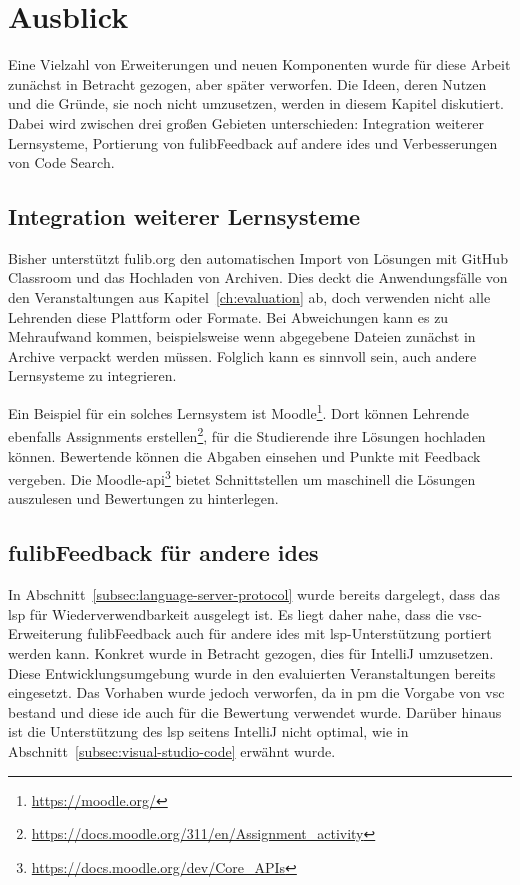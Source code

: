 \chapter{Ausblick}\label{ch:future-work}

Eine Vielzahl von Erweiterungen und neuen Komponenten wurde für diese Arbeit zunächst in Betracht gezogen, aber später verworfen.
Die Ideen, deren Nutzen und die Gründe, sie noch nicht umzusetzen, werden in diesem Kapitel diskutiert.
Dabei wird zwischen drei großen Gebieten unterschieden:
Integration weiterer Lernsysteme, Portierung von fulibFeedback auf andere \acp{ide} und Verbesserungen von Code Search.

\section{Integration weiterer Lernsysteme}

Bisher unterstützt fulib.org den automatischen Import von Lösungen mit GitHub Classroom und das Hochladen von Archiven.
Dies deckt die Anwendungsfälle von den Veranstaltungen aus Kapitel~\ref{ch:evaluation} ab, doch verwenden nicht alle Lehrenden diese Plattform oder Formate.
Bei Abweichungen kann es zu Mehraufwand kommen, beispielsweise wenn abgegebene Dateien zunächst in Archive verpackt werden müssen.
Folglich kann es sinnvoll sein, auch andere Lernsysteme zu integrieren.

Ein Beispiel für ein solches Lernsystem ist Moodle\footnote{\url{https://moodle.org/}}.
Dort können Lehrende ebenfalls Assignments erstellen\footnote{\url{https://docs.moodle.org/311/en/Assignment_activity}}, für die Studierende ihre Lösungen hochladen können.
Bewertende können die Abgaben einsehen und Punkte mit Feedback vergeben.
Die Moodle-\ac{api}\footnote{\url{https://docs.moodle.org/dev/Core_APIs}} bietet Schnittstellen um maschinell die Lösungen auszulesen und Bewertungen zu hinterlegen.

\section{fulibFeedback für andere \acsp{ide}}\label{sec:other-ides}

In Abschnitt~\ref{subsec:language-server-protocol} wurde bereits dargelegt, dass das \ac{lsp} für Wiederverwendbarkeit ausgelegt ist.
Es liegt daher nahe, dass die \ac{vsc}-Erweiterung fulibFeedback auch für andere \acp{ide} mit \ac{lsp}-Unterstützung portiert werden kann.
Konkret wurde in Betracht gezogen, dies für IntelliJ umzusetzen.
Diese Entwicklungsumgebung wurde in den evaluierten Veranstaltungen bereits eingesetzt.
Das Vorhaben wurde jedoch verworfen, da in \ac{pm} die Vorgabe von \ac{vsc} bestand und diese \ac{ide} auch für die Bewertung verwendet wurde.
Darüber hinaus ist die Unterstützung des \ac{lsp} seitens IntelliJ nicht optimal, wie in Abschnitt~\ref{subsec:visual-studio-code} erwähnt wurde.

